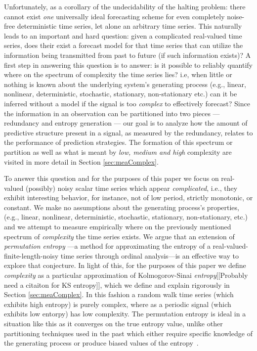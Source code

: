 Unfortunately, as a corollary of the undecidability of the halting problem: there cannot exist \emph{one} universally ideal forecasting scheme for even completely noise-free deterministic time series\cite{weigend-book}, let alone an arbitrary time series. This naturally leads to an important and hard question: given a complicated real-valued time series, does their exist a forecast model for that time series that can utilize the information being transmitted from past to future (if such information exists)? A first step in answering this question is to answer: is it possible to reliably quantify where on the spectrum of complexity the time series lies? i.e, when little or nothing is known about the underlying system's generating process (e.g., linear, nonlinear, deterministic, stochastic, stationary, non-stationary etc.) can it be inferred without a model if the signal is too \emph{complex} to effectively forecast? Since the information in an observation can be partitioned into two pieces --- redundancy and entropy generation\cite{crutchfield2003} --- our goal is to analyze how the amount of predictive structure present in a signal, as measured by the redundancy, relates to the performance of prediction strategies. The formation of this spectrum or partition as well as what is meant by \emph{low, medium and high} complexity are visited in more detail in Section \ref{sec:meaComplex}.


To answer this question and for the purposes of this paper we focus on real-valued (possibly) noisy scalar time series which appear \emph{complicated}, i.e., they exhibit interesting behavior, for instance, not of low period, strictly monotonic, or constant. We make no assumptions about the generating process's properties,(e.g., linear, nonlinear, deterministic, stochastic, stationary, non-stationary, etc.) and we attempt to measure empirically where on the previously mentioned spectrum of \emph{complexity} the time series exists.
We argue that an extension of \emph{permutation entropy}
\cite{bandt2002per}---a method for approximating the entropy of a real-valued-finite-length-noisy time series through ordinal analysis---is an effective way to explore that conjecture. In light of this, for the purposes of this paper we define \emph{complexity} as a particular approximation of Kolmogorov-Sinai \emph{entropy}[[Probably need a citaiton for KS entropy]], which we define and explain rigorously in Section \ref{sec:meaComplex}. In this fashion a random walk time series (which exhibits high entropy) is purely complex, where as a periodic signal (which exhibits low entorpy) has low complexity. The permutation entropy is ideal in a situation like this as it converges on the true entropy value, unlike other partitioning techniques used in the past which either require specific knowledge of the generating process or produce biased values of the entropy~\cite{bollt2001}.


